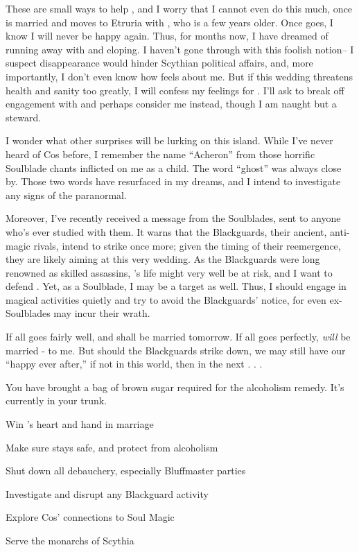 \documentclass[char]{Kos}
\begin{document}
These are small ways to help \cBride{}, and I worry that I cannot even do this much, once \cBride{\they} is married and moves to Etruria with \cGroom{}, who is a few years older. Once \cBride{\they} goes, I know I will never be happy again. Thus, for months now, I have dreamed of running away with \cBride{} and eloping. I haven't gone through with this foolish notion-- I suspect \cBride{\their} disappearance would hinder Scythian political affairs, and, more importantly, I don't even know how \cBride{} feels about me. But if this wedding threatens \cBride{\their} health and sanity too greatly, I will confess my feelings for \cBride{\them}. I'll ask \cBride{\them} to break off \cBride{\their} engagement with \cGroom{} and perhaps consider me instead, though I am naught but a steward. 

I wonder what other surprises will be lurking on this island. While I've never heard of Cos before, I remember the name ``Acheron'' from those horrific Soulblade chants inflicted on me as a child. The word ``ghost'' was always close by. Those two words have resurfaced in my dreams, and I intend to investigate any signs of the paranormal.

Moreover, I've recently received a message from the Soulblades, sent to anyone who's ever studied with them. It warns that the Blackguards, their ancient, anti-magic rivals, intend to strike once more; given the timing of their reemergence, they are likely aiming at this very wedding. As the Blackguards were long renowned as skilled assassins, \cBride{}'s life might very well be at risk, and I want to defend \cBride{\them}. Yet, as a Soulblade, I may be a target as well. Thus, I should engage in magical activities quietly and try to avoid the Blackguards' notice, for even ex-Soulblades may incur their wrath.

If all goes fairly well, \cBride{} and \cGroom{} shall be married tomorrow. If all goes perfectly, \cBride{} \emph{will} be married - to me. But should the Blackguards strike \cBride{\them} down, we may still have our ``happy ever after,'' if not in this world, then in the next . . .
\begin{itemz}[Notes]
  \item You have brought a bag of brown sugar required for the alcoholism remedy. It's currently in your trunk.
  \end{itemz}

\begin{itemz}[Goals]
 \item Win \cBride{}'s heart and \cBride{\their} hand in marriage
 \item Make sure \cBride{} stays safe, and protect \cBride{\them} from alcoholism
 \item Shut down all debauchery, especially Bluffmaster parties
 \item Investigate and disrupt any Blackguard activity
 \item Explore Cos' connections to Soul Magic
 \item Serve the monarchs of Scythia
\end{itemz}
\end{document}
